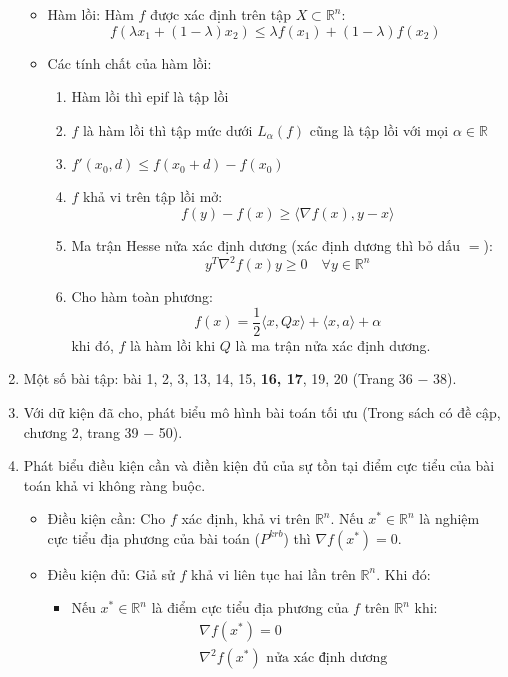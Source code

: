 \documentclass[12pt]{article}
\begin{document}
\begin{enumerate}
\begin{itemize}
		\item Hàm lồi: Hàm $f$ được xác định trên tập $X \subset \mathbb{R}^n:$
		$$
			f(\lambda x_1 + (1-\lambda)x_2) \leq \lambda f(x_1) + (1-\lambda)f(x_2)
		$$
		\item Các tính chất của hàm lồi:
		\begin{enumerate}
			\item Hàm lồi thì epif là tập lồi 
			\item $f$ là hàm lồi thì tập mức dưới $L_\alpha (f)$ cũng là tập lồi với mọi $\alpha \in \mathbb{R}$
			\item $f'(x_0,d) \leq f(x_0 +d) - f(x_0)$
			\item $f$ khả vi trên tập lồi mở:
			$$
				f(y) - f(x) \geq \langle \nabla f(x), y-x\rangle
			$$
			\item Ma trận Hesse nửa xác định dương (xác định dương thì bỏ dấu $=$):
			$$
				y^T \nabla^2 f(x) y \geq 0 \quad \forall y \in \mathbb{R}^n
			$$
			\item Cho hàm toàn phương:
			$$
				f(x) = \frac{1}{2} \langle x, Qx \rangle + \langle x,a \rangle + \alpha
			$$
			khi đó, $f$ là hàm lồi khi $Q$ là ma trận nửa xác định dương.
		\end{enumerate}
	\end{itemize}
	\item[]
		\begin{tcolorbox}
			Một số bài tập: bài 1, 2, 3, 13, 14, 15, \textbf{16, 17}, 19, 20 (Trang 36 $-$ 38).
		\end{tcolorbox}
	\item Với dữ kiện đã cho, phát biểu mô hình bài toán tối ưu (Trong sách có đề cập, chương 2, trang 39 $-$ 50).
	\item Phát biểu điều kiện cần và điền kiện đủ của sự tồn tại điểm cực tiểu của bài toán khả vi không ràng buộc.
	\begin{itemize}
		\item Điều kiện cần: Cho $f$ xác định, khả vi trên $\mathbb{R}^n$. Nếu $x^* \in \mathbb{R}^n$ là nghiệm cực tiểu địa phương của bài toán ($P^{krb}$) thì $\nabla f(x^*) = 0.$
		\item Điều kiện đủ: Giả sử $f$ khả vi liên tục hai lần trên $\mathbb{R}^n.$ Khi đó:
		\begin{itemize}
			\item Nếu $x^* \in \mathbb{R}^n$ là điểm cực tiểu địa phương của $f$ trên $\mathbb{R}^n$ khi:
			\begin{align*}
				&\nabla f(x^*) = 0 \\
				&\nabla^2 f(x^*) \text{ nửa xác định dương}	

\end{align*}
\end{itemize}
\end{itemize}
\end{enumerate}
\end{document}
